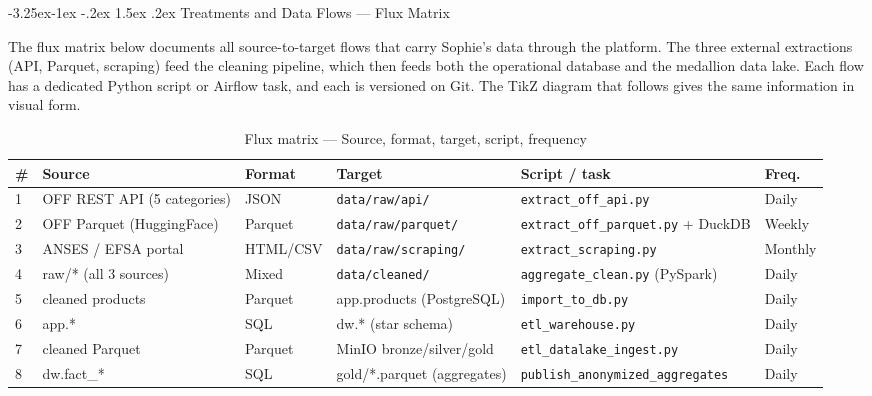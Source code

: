\documentclass[a4paper,11pt,oneside,openany]{report}
\makeatletter
\renewcommand\subsubsection{\@startsection{subsubsection}{3}{\z@}%
  {-3.25ex\@plus -1ex \@minus -.2ex}%
  {1.5ex \@plus .2ex}%
  {\normalfont\normalsize\bfseries\color{ntblue}}}
\makeatother
\begin{document}
\subsubsection{Treatments and Data Flows --- Flux Matrix}

The flux matrix below documents all source-to-target flows that
carry Sophie's data through the platform. The three external
extractions (API, Parquet, scraping) feed the cleaning pipeline,
which then feeds both the operational database and the medallion
data lake. Each flow has a dedicated Python script or Airflow task,
and each is versioned on Git. The TikZ diagram that follows gives
the same information in visual form.

\begin{table}[H]
\centering
\caption{Flux matrix --- Source, format, target, script, frequency}
\label{tab:flux-matrix}
\begin{tabularx}{\textwidth}{L{0.5cm} L{3.3cm} L{1.6cm} L{3cm} L{3.6cm} L{1.5cm}}
\toprule
\textbf{\#} & \textbf{Source} & \textbf{Format} & \textbf{Target} & \textbf{Script / task} & \textbf{Freq.} \\
 & OFF REST API (5 categories) & JSON & \texttt{data/raw/api/} & \texttt{extract\_off\_api.py} & Daily \\
2 & OFF Parquet (HuggingFace) & Parquet & \texttt{data/raw/parquet/} & \texttt{extract\_off\_parquet.py} + DuckDB & Weekly \\
3 & ANSES / EFSA portal & HTML/CSV & \texttt{data/raw/scraping/} & \texttt{extract\_scraping.py} & Monthly \\
4 & raw/* (all 3 sources) & Mixed & \texttt{data/cleaned/} & \texttt{aggregate\_clean.py} (PySpark) & Daily \\
5 & cleaned products & Parquet & app.products (PostgreSQL) & \texttt{import\_to\_db.py} & Daily \\
6 & app.* & SQL & dw.* (star schema) & \texttt{etl\_warehouse.py} & Daily \\
7 & cleaned Parquet & Parquet & MinIO bronze/silver/gold & \texttt{etl\_datalake\_ingest.py} & Daily \\
8 & dw.fact\_* & SQL & gold/*.parquet (aggregates) & \texttt{publish\_anonymized\_aggregates} & Daily \\
\bottomrule
\end{tabularx}
\end{table}
\end{document}
